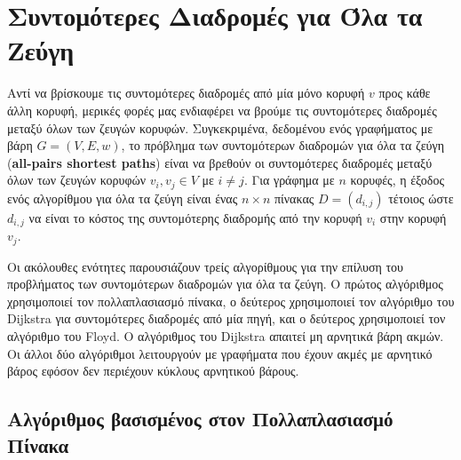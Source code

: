 \documentclass[12pt,a4paper]{article}
\begin{document}
\section{Συντομότερες Διαδρομές για Όλα τα Ζεύγη}
Αντί να βρίσκουμε τις συντομότερες διαδρομές από μία μόνο κορυφή $v$ προς κάθε άλλη κορυφή, μερικές φορές μας ενδιαφέρει να βρούμε τις συντομότερες διαδρομές μεταξύ όλων των ζευγών κορυφών. Συγκεκριμένα, δεδομένου ενός γραφήματος με βάρη $G=(V,E,w)$, το πρόβλημα των συντομότερων διαδρομών για όλα τα ζεύγη (\textbf{\foreignlanguage{english}{all-pairs shortest paths}}) είναι να βρεθούν οι συντομότερες διαδρομές μεταξύ όλων των ζευγών κορυφών $v_i, v_j \in V$ με $i \neq j$. Για γράφημα με $n$ κορυφές, η έξοδος ενός αλγορίθμου για όλα τα ζεύγη είναι ένας $n \times n$ πίνακας $D=(d_{i,j})$ τέτοιος ώστε $d_{i,j}$ να είναι το κόστος της συντομότερης διαδρομής από την κορυφή $v_i$ στην κορυφή $v_j$.

Οι ακόλουθες ενότητες παρουσιάζουν τρείς αλγορίθμους για την επίλυση του προβλήματος των συντομότερων διαδρομών για όλα τα ζεύγη. Ο πρώτος αλγόριθμος χρησιμοποιεί τον πολλαπλασιασμό πίνακα, ο δεύτερος χρησιμοποιεί τον αλγόριθμο του \foreignlanguage{english}{Dijkstra} για συντομότερες διαδρομές από μία πηγή, και ο δεύτερος χρησιμοποιεί τον αλγόριθμο του \foreignlanguage{english}{Floyd}. Ο αλγόριθμος του \foreignlanguage{english}{Dijkstra} απαιτεί μη αρνητικά βάρη ακμών. Οι άλλοι δύο αλγόριθμοι λειτουργούν με γραφήματα που έχουν ακμές με αρνητικό βάρος εφόσον δεν περιέχουν κύκλους αρνητικού βάρους.

\subsection{Αλγόριθμος βασισμένος στον Πολλαπλασιασμό Πίνακα}
\end{document}
